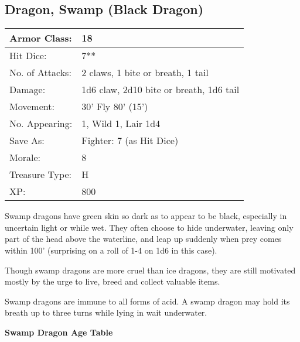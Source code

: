 \documentclass[a4paper,twoside,openany,10pt]{book}
\begin{document}
\begin{multicols}{2}
\subsection*{Dragon, Swamp (Black Dragon)}\label{dragon-swamp-black-dragon}

\begin{tabularx}{0.48\textwidth}{@{}lX@{}}
Armor Class: & 18 \\\hline
Hit Dice: & 7** \\\hline
No. of Attacks: & 2 claws, 1 bite or breath, 1 tail \\\hline
Damage: & 1d6 claw, 2d10 bite or breath, 1d6 tail \\\hline
Movement: & 30' Fly 80'
(15') \\\hline
No. Appearing: & 1, Wild 1, Lair 1d4 \\\hline
Save As: & Fighter: 7 (as Hit Dice) \\\hline
Morale: & 8 \\\hline
Treasure Type: & H \\\hline
XP: & 800 \\\hline
\end{tabularx}\medskip

Swamp dragons have green skin so dark as to appear to be black, especially in uncertain light or while wet. They often choose to hide underwater, leaving only part of the head above the waterline, and leap up suddenly when prey comes within 100' (surprising on a roll of 1-4 on 1d6 in this case).

Though swamp dragons are more cruel than ice dragons, they are still motivated mostly by the urge to live, breed and collect valuable items.

Swamp dragons are immune to all forms of acid. A swamp dragon may hold its breath up to three turns while lying in wait underwater.\\

\begin{center}
	\textbf{Swamp Dragon Age Table}\medskip


\end{center}
\end{multicols}
\end{document}
